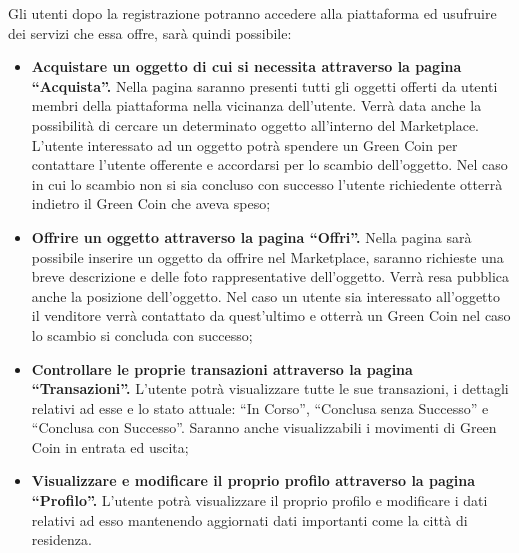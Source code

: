 Gli utenti dopo la registrazione potranno accedere alla piattaforma ed usufruire dei servizi che essa offre, sarà quindi possibile:  
\begin{itemize}
    \item \textbf{Acquistare un oggetto di cui si necessita attraverso la pagina “Acquista”.} Nella pagina saranno presenti tutti gli oggetti offerti da utenti membri della piattaforma nella vicinanza dell'utente. Verrà data anche la possibilità di cercare un determinato oggetto all'interno del Marketplace. L'utente interessato ad un oggetto potrà spendere un Green Coin per contattare l'utente offerente e accordarsi per lo scambio dell'oggetto. Nel caso in cui lo scambio non si sia concluso con successo l'utente richiedente otterrà indietro il Green Coin che aveva speso;
    \item \textbf{Offrire un oggetto attraverso la pagina “Offri”.} Nella pagina sarà possibile inserire un oggetto da offrire nel Marketplace, saranno richieste una breve descrizione e delle foto rappresentative dell'oggetto. Verrà resa pubblica anche la posizione dell'oggetto. Nel caso un utente sia interessato all'oggetto il venditore verrà contattato da quest'ultimo e otterrà un Green Coin nel caso lo scambio si concluda con successo;
    \item \textbf{Controllare le proprie transazioni attraverso la pagina “Transazioni”.} L'utente potrà visualizzare tutte le sue transazioni, i dettagli relativi ad esse e lo stato attuale: “In Corso”, “Conclusa senza Successo” e “Conclusa con Successo”. Saranno anche visualizzabili i movimenti di Green Coin in entrata ed uscita;
    \item \textbf{Visualizzare e modificare il proprio profilo attraverso la pagina “Profilo”.} L'utente potrà visualizzare il proprio profilo e modificare i dati relativi ad esso mantenendo aggiornati dati importanti come la città di residenza.
\end{itemize}